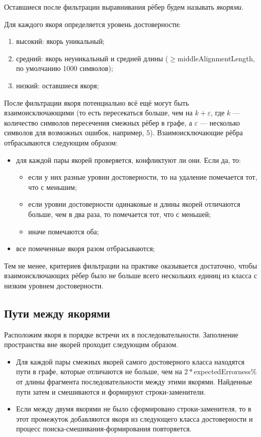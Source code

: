 \documentclass[14pt]{matmex-diploma-custom}
\begin{document}
Оставшиеся после фильтрации выравнивания рёбер будем называть \textit{якорями}. 

Для каждого якоря определяется уровень достоверности:
\begin{enumerate}
    \item высокий: якорь уникальный;
    \item \begin{sloppypar}средний: якорь неуникальный и средней длины ($\ge$middleAlignmentLength, по умолчанию 1000 символов);\end{sloppypar}
    \item низкий: оставшиеся якоря;
\end{enumerate}

После фильтрации якоря потенциально всё ещё могут быть взаимоисключающими (то есть пересекаться больше, чем на $k+\varepsilon$, где $k$ --- количество символов пересечения смежных рёбер в графе, а $\varepsilon$ --- несколько символов для возможных ошибок, например, $5$). Взаимоисключающие рёбра отбрасываются следующим образом:
\begin{itemize}
    \item для каждой пары якорей проверяется, конфликтуют ли они. Если да, то:
    \begin{itemize}
        \item если у них разные уровни достоверности, то на удаление помечается тот, что с меньшим;
        \item если уровни достоверности одинаковые и длины якорей отличаются больше, чем в два раза, то помечается тот, что с меньшей;
        \item иначе помечаются оба;
    \end{itemize}
    \item все помеченные якоря разом отбрасываются;
\end{itemize}

Тем не менее, критериев фильтрации на практике оказывается достаточно, чтобы взаимоисключающих рёбер было не больше всего нескольких единиц из класса с низким уровнем достоверности.

\subsection{Пути между якорями}
Расположим якоря в порядке встречи их в последовательности. Заполнение пространства вне якорей проходит следующим образом.
\begin{itemize}
    \item Для каждой пары смежных якорей самого достоверного класса находятся пути в графе, которые отличаются не больше, чем на $2*$expectedErrorness$\%$ от длины фрагмента последовательности между этими якорями. Найденные пути затем и смешиваются и формируют строки-заменители.
    \item Если между двумя якорями не было сформировано строки-заменителя, то в этот промежуток добавляются якоря из следующего класса достоверности и процесс поиска-смешивания-формирования повторяется.
\end{itemize}
\end{document}
